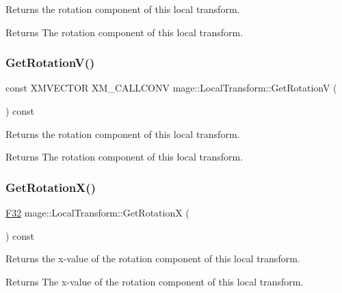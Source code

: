 Returns the rotation component of this local transform.

\begin{DoxyReturn}{Returns}
The rotation component of this local transform. 
\end{DoxyReturn}
\mbox{\label{classmage_1_1_local_transform_a489f350ed2e1e7eea1d168502cd03e88}} 
\subsubsection{\texorpdfstring{Get\+Rotation\+V()}{GetRotationV()}}
{\footnotesize\ttfamily const X\+M\+V\+E\+C\+T\+OR X\+M\+\_\+\+C\+A\+L\+L\+C\+O\+NV mage\+::\+Local\+Transform\+::\+Get\+RotationV (\begin{DoxyParamCaption}{ }\end{DoxyParamCaption}) const\hspace{0.3cm}{\ttfamily [noexcept]}}

Returns the rotation component of this local transform.

\begin{DoxyReturn}{Returns}
The rotation component of this local transform. 
\end{DoxyReturn}
\mbox{\label{classmage_1_1_local_transform_af60f86fbaa2dc4562d67100215a63a61}} 
\subsubsection{\texorpdfstring{Get\+Rotation\+X()}{GetRotationX()}}
{\footnotesize\ttfamily \mbox{\hyperlink{namespacemage_aa97e833b45f06d60a0a9c4fc22ae02c0}{F32}} mage\+::\+Local\+Transform\+::\+Get\+RotationX (\begin{DoxyParamCaption}{ }\end{DoxyParamCaption}) const\hspace{0.3cm}{\ttfamily [noexcept]}}

Returns the x-\/value of the rotation component of this local transform.

\begin{DoxyReturn}{Returns}
The x-\/value of the rotation component of this local transform. 
\end{DoxyReturn}
\mbox{\label{classmage_1_1_local_transform_a7d6b4eba97d85e80dacb6dc663c17e9c}} 
